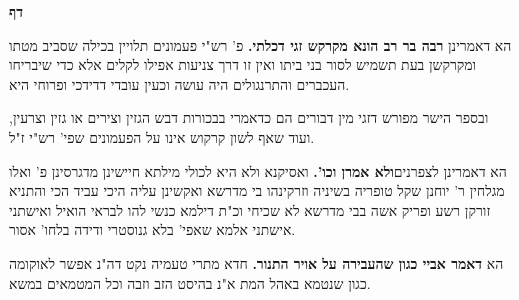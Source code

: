 \documentclass[12pt, openany]{book}
\newcommand{\sethebfont}{
\fontsize{10.5pt}{21.0pt} \selectfont
}
\newcommand{\twocol}[1]{
	{\sethebfont \begin{multicols}{2}
			#1
	\end{multicols}}	
}
\newcommand{\textblock}[1]{
{\sethebfont #1\\}	
}
\newcommand{\chapname}{}
\newcommand{\newchap}[1]{
	\addcontentsline{toc}{chapter}{#1}
	\renewcommand{\chapname}{#1}
		\begin{center}
			\textbf{%
\fontsize{16pt}{16pt}\selectfont
				#1}
		\end{center}
}
\begin{document}
\newchap{דף }
\twocol{הא דאמרינן \textbf{רבה בר רב הונא מקרקש זגי דכלתי.}  פ' רש"י פעמונים תלויין בכילה שסביב מטתו ומקרקשן בעת תשמיש לסור בני ביתו ואין זו דרך צניעות אפילו לקלים אלא כדי שיבריחו העכברים והתרנגולים היה עושה וכעין עובדי דדידכי ופרוחי היא.\par ובספר הישר מפורש דזגי מין דבורים הם כדאמרי בבכורות דבש הגזין וצירים או גזין וצרעין, ועוד שאף לשון קרקוש אינו על הפעמונים שפי' רש"י ז"ל. 
\par הא דאמרינן לצפרנים\textbf{ולא אמרן וכו'.}  ואסיקנא ולא היא לכולי מילתא חיישינן מדגרסינן פ' ואלו מגלחין ר' יוחנן שקל טופריה בשיניה וזרקינהו בי מדרשא ואקשינן עליה היכי עביד הכי והתניא זורקן רשע ופריק אשה בבי מדרשא לא שכיחי וכ"ת דילמא כנשי להו לבראי הואיל ואישתני אישתני אלמא שאפי' בלא גנוסטרי ודידה בלחו' אסור. 
\par הא \textbf{דאמר אביי כגון שהעבירה על אויר התנור.}  חדא מתרי טעמיה נקט דה"נ אפשר לאוקומה כגון שנטמא באהל המת א"נ בהיסט הזב וזבה וכל המטמאים במשא. 
\par}
\textblock{}{}
\textblock{}{}
\end{document}
